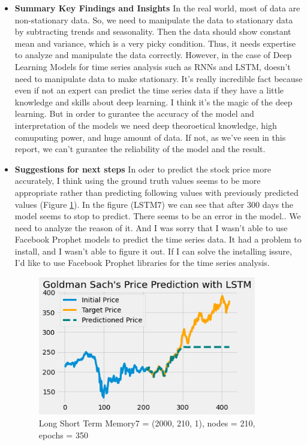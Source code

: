 \documentclass[12pt]{article}
\begin{document}
\begin{itemize}
\item \textbf{Summary Key Findings and Insights}
In the real world, most of data are non-stationary data. So, we need to manipulate the data to stationary data by subtracting trends and seasonality. Then the data should show constant mean and variance, which is a very picky condition. Thus, it needs expertise to analyze and manipulate the data correctly. However, in the case of Deep Learning Models for time series analysis such as RNNs and LSTM, doesn't need to manipulate data to make stationary. It's really incredible fact because even if not an expert can predict the time series data if they have a little knowledge and skills about deep learning. I think it's the magic of the deep learning. But in order to gurantee the accuracy of the model and interpretation of the models we need deep theoroetical knowledge, high comuputing power, and huge amount of data. If not, as we've seen in this report, we can't gurantee the reliability of the model and the result.


\item \textbf{Suggestions for next steps}
In oder to predict the stock price more accurately, I think using the ground truth values seems to be more appropriate rather than predicting following values with previously predicted values (Figure \ref{lstm7}). In the figure (LSTM7) we can see that after 300 days the model seems to stop to predict. There seems to be an error in the model.. We need to analyze the reason of it. And I was sorry that I wasn't able to use Facebook Prophet models to predict the time series data. It had a problem to install, and I wasn't able to figure it out. If I can solve the installing issure, I'd like to use Facebook Prophet libraries for the time series analysis.

\begin{figure}[H]
  \centering
  \includegraphics[width=0.9\textwidth]{figures/lstm7.png}
  \caption{Long Short Term Memory7 = (2000, 210, 1), nodes = 210, epochs = 350}\label{lstm7}
\end{figure}

\end{itemize}
\end{document}
